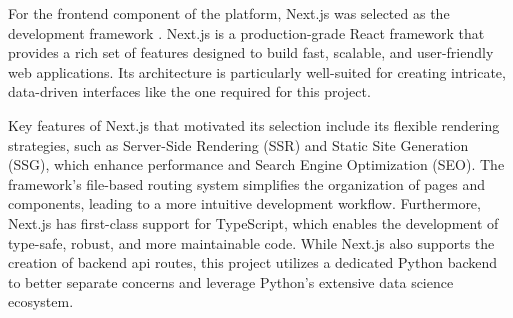 For the frontend component of the platform, Next.js was selected as the development framework \cite{NEXTJS}. Next.js is a production-grade React framework that provides a rich set of features designed to build fast, scalable, and user-friendly web applications. Its architecture is particularly well-suited for creating intricate, data-driven interfaces like the one required for this project.

Key features of Next.js that motivated its selection include its flexible rendering strategies, such as Server-Side Rendering (SSR) and Static Site Generation (SSG), which enhance performance and Search Engine Optimization (SEO). The framework's file-based routing system simplifies the organization of pages and components, leading to a more intuitive development workflow. Furthermore, Next.js has first-class support for TypeScript, which enables the development of type-safe, robust, and more maintainable code. While Next.js also supports the creation of backend \acs{api} routes, this project utilizes a dedicated Python backend to better separate concerns and leverage Python's extensive data science ecosystem.